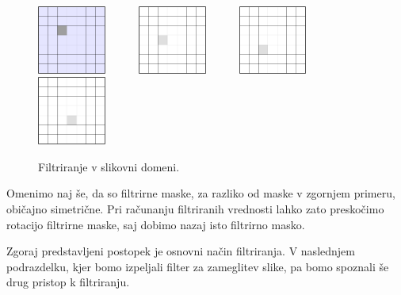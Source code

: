 \begin{primer}
\begin{figure}[htbp]
  \includegraphics[width=0.2\textwidth]{./slike-latex/filter1s}\ \ \ \ \ \ 
  \includegraphics[width=0.2\textwidth]{./slike-latex/filter2s}\ \ \ \ \ \ 
  \includegraphics[width=0.2\textwidth]{./slike-latex/filter3s}\ \ \ \ \ \ 
  \includegraphics[width=0.2\textwidth]{./slike-latex/filter4s}
  \caption{Filtriranje v slikovni domeni.}
  \label{fig:filtriranje}
\end{figure}

\end{primer}
%
Omenimo naj še, da so filtrirne maske, za razliko od maske v zgornjem primeru, običajno simetrične. Pri računanju filtriranih vrednosti lahko zato preskočimo rotacijo filtrirne maske, saj dobimo nazaj isto filtrirno masko.

Zgoraj predstavljeni postopek je osnovni način filtriranja. V naslednjem podrazdelku, kjer bomo izpeljali filter za zameglitev slike, pa bomo spoznali še drug pristop k filtriranju.
%
